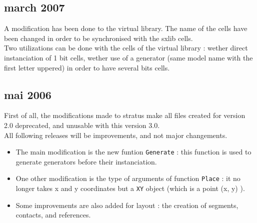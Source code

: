     \subsection{march 2007}
    
A modification has been done to the virtual library. The name of the cells have been changed in order to be synchronised with the sxlib cells.\\
\indent Two utilizations can be done with the cells of the virtual library : wether direct instanciation of 1 bit cells, wether use of a generator (same model name with the first letter uppered) in order to have several bits cells.

    \subsection{mai 2006}

First of all, the modifications made to stratus make all files created for version 2.0 deprecated, and unusable with this version 3.0.\\
\indent All following releases will be improvements, and not major changements.\\

\begin{itemize}
    \item The main modification is the new funtion \verb-Generate- : this function is used to generate generators before their instanciation.\\
    \item One other modification is the type of arguments of function \verb-Place- : it no longer takes x and y coordinates but a \verb-XY- object (which is a point (x, y) ).\\
    \item Some improvements are also added for layout : the creation of segments, contacts, and references.
\end{itemize}
